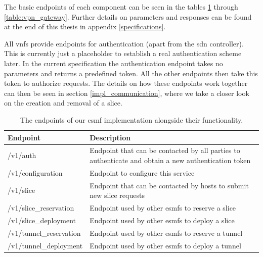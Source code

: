 The basic endpoints of each component can be seen in the tables \ref{table:esmf} through \ref{table:vpn_gateway}. Further details on parameters and responses can be found at the end of this thesis in appendix \ref{specifications}.

All \acrshort{vnf}s provide endpoints for authentication (apart from the \acrshort{sdn} controller). This is currently just a placeholder to establish a real authentication scheme later. In the current specification the authentication endpoint takes no parameters and returns a predefined token. All the other endpoints then take this token to authorize requests. The details on how these endpoints work together can then be seen in section \ref{impl_communication}, where we take a closer look on the creation and removal of a slice.

\begin{table}[htp]
    \begin{tabularx}{\textwidth}{ |l|X| }
        \hline
        \textbf{Endpoint}       & \textbf{Description}                                                                                \\
        \hline
        /v1/auth                & Endpoint that can be contacted by all parties to authenticate and obtain a new authentication token \\
        /v1/configuration       & Endpoint to configure this service                                                                  \\
        \hline
        /v1/slice               & Endpoint that can be contacted by hosts to submit new slice requests                                \\
        \hline
        /v1/slice\_reservation  & Endpoint used by other \acrshort{esmf}s to reserve a slice                                          \\
        /v1/slice\_deployment   & Endpoint used by other \acrshort{esmf}s to deploy a slice                                           \\
        /v1/tunnel\_reservation & Endpoint used by other \acrshort{esmf}s to reserve a tunnel                                         \\
        /v1/tunnel\_deployment  & Endpoint used by other \acrshort{esmf}s to deploy a tunnel                                          \\
        \hline
    \end{tabularx}
    \caption[\acrshort{esmf} endpoints]{The endpoints of our \acrshort{esmf} implementation alongside their functionality.}
    \label{table:esmf}
\end{table}


